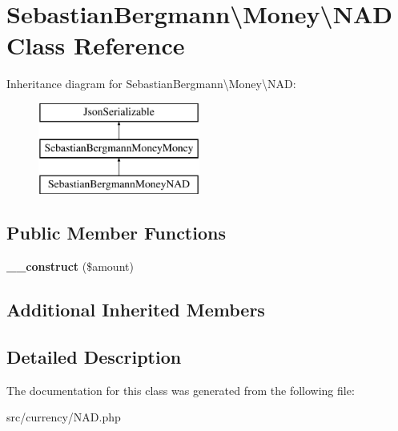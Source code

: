 \hypertarget{classSebastianBergmann_1_1Money_1_1NAD}{}\section{Sebastian\+Bergmann\textbackslash{}Money\textbackslash{}N\+A\+D Class Reference}
\label{classSebastianBergmann_1_1Money_1_1NAD}
Inheritance diagram for Sebastian\+Bergmann\textbackslash{}Money\textbackslash{}N\+A\+D\+:\begin{figure}[H]
\begin{center}
\leavevmode
\includegraphics[height=3.000000cm]{classSebastianBergmann_1_1Money_1_1NAD}
\end{center}
\end{figure}
\subsection*{Public Member Functions}
\begin{DoxyCompactItemize}
\item 
\hypertarget{classSebastianBergmann_1_1Money_1_1NAD_af0038f8c9ac4655bce83a8c109ec88d9}{}{\bfseries \+\_\+\+\_\+construct} (\$amount)\label{classSebastianBergmann_1_1Money_1_1NAD_af0038f8c9ac4655bce83a8c109ec88d9}

\end{DoxyCompactItemize}
\subsection*{Additional Inherited Members}


\subsection{Detailed Description}


The documentation for this class was generated from the following file\+:\begin{DoxyCompactItemize}
\item 
src/currency/N\+A\+D.\+php\end{DoxyCompactItemize}
